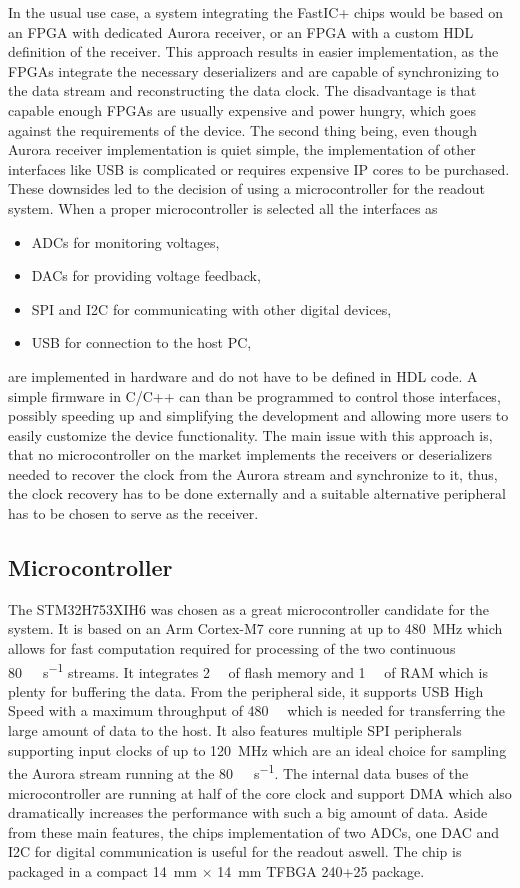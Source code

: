 In the usual use case, a system integrating the FastIC+ chips would be based on an FPGA with dedicated Aurora receiver, or an FPGA with a custom HDL definition of the receiver. This approach results in easier implementation, as the FPGAs integrate the necessary deserializers and are capable of synchronizing to the data stream and reconstructing the data clock. The disadvantage is that capable enough FPGAs are usually expensive and power hungry, which goes against the requirements of the device. The second thing being, even though Aurora receiver implementation is quiet simple, the implementation of other interfaces like USB is complicated or requires expensive IP cores to be purchased. These downsides led to the decision of using a microcontroller for the readout system. 
When a proper microcontroller is selected all the interfaces as
\begin{itemize}
    \item ADCs for monitoring voltages,
    \item DACs for providing voltage feedback,
    \item SPI and I2C for communicating with other digital devices,
    \item USB for connection to the host PC,
\end{itemize}
are implemented in hardware and do not have to be defined in HDL code. A simple firmware in C/C++ can than be programmed to control those interfaces, possibly speeding up and simplifying the development and allowing more users to easily customize the device functionality. The main issue with this approach is, that no microcontroller on the market implements the receivers or deserializers needed to recover the clock from the Aurora stream and synchronize to it, thus, the clock recovery has to be done externally and a suitable alternative peripheral has to be chosen to serve as the receiver.

\subsection{Microcontroller}
The STM32H753XIH6 was chosen as a great microcontroller candidate for the system. It is based on an Arm Cortex-M7 core running at up to \SI{480}{\mega\hertz} which allows for fast computation required for processing of the two continuous \SI{80}{\mega\bit\per\second} streams. It integrates \SI{2}{\mega\byte} of flash memory and \SI{1}{\mega\byte} of RAM which is plenty for buffering the data. From the peripheral side, it supports USB High Speed with a maximum throughput of \SI{480}{\mega\bit} which is needed for transferring the large amount of data to the host. It also features multiple SPI peripherals supporting input clocks of up to \SI{120}{\mega\hertz} which are an ideal choice for sampling the Aurora stream running at the \SI{80}{\mega\bit\per\second}. The internal data buses of the microcontroller are running at half of the core clock and support DMA which also dramatically increases the performance with such a big amount of data. Aside from these main features, the chips implementation of two ADCs, one DAC and I2C for digital communication is useful for the readout aswell. The chip is packaged in a compact \SI{14}{\milli\meter} $\times$ \SI{14}{\milli\meter} TFBGA 240+25 package.

